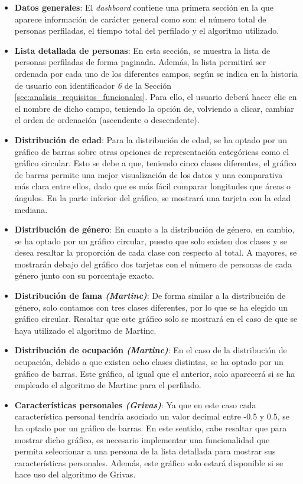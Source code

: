 \begin{itemize}
	\item \textbf{Datos generales}: El \textit{dashboard} contiene una primera sección en la que aparece información de carácter general
		como son: el número total de personas perfiladas, el tiempo total del perfilado y el algoritmo utilizado.
	\item \textbf{Lista detallada de personas}: En esta sección, se muestra la lista de personas perfiladas de forma paginada. Además, la lista
		permitirá ser ordenada por cada uno de los diferentes campos, según se indica en la historia de usuario con identificador 
		\textit{6} de la Sección \ref{sec:analisis_requisitos_funcionales}. Para ello, el usuario deberá hacer clic en el nombre de dicho campo, teniendo
		la opción de, volviendo a clicar, cambiar el orden de ordenación (ascendente o descendente).
	\item \textbf{Distribución de edad}: Para la distribución de edad, se ha optado por un gráfico de barras sobre otras opciones de representación
		categóricas como el gráfico circular. Esto se debe a que, teniendo cinco clases diferentes, el gráfico de barras permite una mejor visualización 
		de los datos y una comparativa más clara entre ellos, dado que es más fácil comparar longitudes que áreas o ángulos. En la parte inferior del gráfico,
		se mostrará una tarjeta con la edad mediana.
	\item \textbf{Distribución de género}: En cuanto a la distribución de género, en cambio, se ha optado por un gráfico circular, puesto que solo existen dos clases
		y se desea resaltar la proporción de cada clase con respecto al total. A mayores, se mostrarán debajo del gráfico dos tarjetas con el número de personas
		de cada género junto con su porcentaje exacto.
	\item \textbf{Distribución de fama \textit{(Martinc)}}: De forma similar a la distribución de género, solo contamos con tres clases diferentes, por lo que
		se ha elegido un gráfico circular. Resaltar que este gráfico solo se mostrará en el caso de que se haya utilizado el algoritmo de Martinc.
	\item \textbf{Distribución de ocupación \textit{(Martinc)}}: En el caso de la distribución de ocupación, debido a que existen ocho clases distintas, se ha optado
		por un gráfico de barras. Este gráfico, al igual que el anterior, solo aparecerá si se ha empleado el algoritmo de Martinc para el perfilado.
	\item \textbf{Características personales \textit{(Grivas)}}: Ya que en este caso cada característica personal tendría asociado un valor decimal entre -0.5 y 0.5,
		se ha optado por un gráfico de barras. En este sentido, cabe resaltar que para mostrar dicho gráfico, es necesario implementar una funcionalidad que permita
		seleccionar a una persona de la lista detallada para mostrar sus características personales. Además, este gráfico solo estará disponible si se hace uso del algoritmo de Grivas.
\end{itemize}

